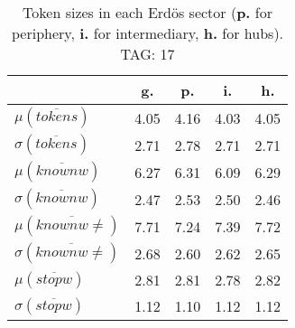 \begin{table}[h!]
\begin{center}
\begin{tabular}{| l || c | c | c | c |}\hline
 & {\bf g.} & {\bf p.} & {\bf i.} & {\bf h.} \\\hline\hline
$\mu(\overline{tokens})$ & 4.05  & 4.16  & 4.03  & 4.05 \\
$\sigma(\overline{tokens})$ & 2.71  & 2.78  & 2.71  & 2.71 \\\hline
$\mu(\overline{knownw})$ & 6.27  & 6.31  & 6.09  & 6.29 \\
$\sigma(\overline{knownw})$ & 2.47  & 2.53  & 2.50  & 2.46 \\\hline
$\mu(\overline{knownw \neq})$ & 7.71  & 7.24  & 7.39  & 7.72 \\
$\sigma(\overline{knownw \neq})$ & 2.68  & 2.60  & 2.62  & 2.65 \\\hline
$\mu(\overline{stopw})$ & 2.81  & 2.81  & 2.78  & 2.82 \\
$\sigma(\overline{stopw})$ & 1.12  & 1.10  & 1.12  & 1.12 \\\hline
\end{tabular}
\caption{Token sizes in each Erd\"os sector ({{\bf p.}} for periphery, {{\bf i.}} for intermediary, {{\bf h.}} for hubs). TAG: 17}
\end{center}
\end{table}